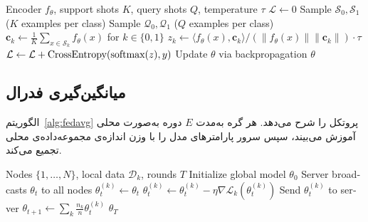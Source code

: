 \begin{algorithm}[htbp]
\begin{latin}\footnotesize
\caption{آموزش اپیزودیک نمونه‌اولیه‌ای}
\label{alg:proto}
\begin{algorithmic}[1]
\Require Encoder $f_\theta$, support shots $K$, query shots $Q$, temperature $\tau$
\State $\mathcal{L} \gets 0$
\State Sample $\mathcal{S}_0, \mathcal{S}_1$ ($K$ examples per class)
\State Sample $\mathcal{Q}_0, \mathcal{Q}_1$ ($Q$ examples per class)
\State $\mathbf{c}_k \gets \frac{1}{K}\sum_{x \in \mathcal{S}_k} f_\theta(x)$ for $k \in \{0,1\}$
\State $z_k \gets \langle f_\theta(x), \mathbf{c}_k \rangle / (\|f_\theta(x)\| \|\mathbf{c}_k\|) \cdot \tau$
\State $\mathcal{L} \gets \mathcal{L} + \text{CrossEntropy}(\text{softmax}(z), y)$
\EndFor
\State Update $\theta$ via backpropagation
\EndFor
\State \Return $\theta$
\end{algorithmic}
\end{latin}
\end{algorithm}

\subsection{میانگین‌گیری فدرال}

الگوریتم~\ref{alg:fedavg} پروتکل  را شرح می‌دهد. هر گره به‌مدت $E$ دوره به‌صورت محلی آموزش می‌بیند، سپس سرور پارامترهای مدل را با وزن اندازه‌ی مجموعه‌داده‌ی محلی تجمیع می‌کند.

\begin{algorithm}[htbp]
\begin{latin}\footnotesize
\caption{میانگین‌گیری فدرال ()}
\label{alg:fedavg}
\begin{algorithmic}[1]
\Require Nodes $\{1,\ldots,N\}$, local data $\mathcal{D}_k$, rounds $T$
\State Initialize global model $\theta_0$
\State Server broadcasts $\theta_t$ to all nodes
\State $\theta_t^{(k)} \gets \theta_t$
\State $\theta_t^{(k)} \gets \theta_t^{(k)} - \eta \nabla \mathcal{L}_k(\theta_t^{(k)})$
\EndFor
\State Send $\theta_t^{(k)}$ to server
\EndFor
\State $\theta_{t+1} \gets \sum_k \frac{n_k}{n} \theta_t^{(k)}$
\EndFor
\State \Return $\theta_T$
\end{algorithmic}
\end{latin}
\end{algorithm}

